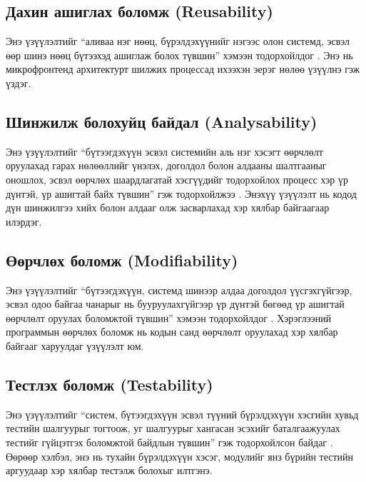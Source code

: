 \subsection{Дахин ашиглах боломж (Reusability)}

Энэ үзүүлэлтийг ``аливаа нэг нөөц, бүрэлдэхүүнийг нэгээс олон системд, эсвэл өөр шинэ нөөц бүтээхэд ашиглаж болох түвшин'' хэмээн тодорхойлдог \cite{iso25010_2}. Энэ нь микрофронтенд архитектурт шилжих процессад ихээхэн эерэг нөлөө үзүүлнэ гэж үздэг.

\subsection{Шинжилж болохуйц байдал (Analysability)}

Энэ үзүүлэлтийг ``бүтээгдэхүүн эсвэл системийн аль нэг хэсэгт өөрчлөлт оруулахад гарах нөлөөллийг үнэлэх, доголдол болон алдааны шалтгааныг оношлох, эсвэл өөрчлөх шаардлагатай хэсгүүдийг тодорхойлох процесс хэр үр дүнтэй, үр ашигтай байх түвшин'' гэж тодорхойлжээ \cite{iso25010_2}. Энэхүү үзүүлэлт нь кодод дүн шинжилгээ хийх болон алдааг олж засварлахад хэр хялбар байгаагаар илэрдэг.

\subsection{Өөрчлөх боломж (Modifiability)}

Энэ үзүүлэлтийг ``бүтээгдэхүүн, системд шинээр алдаа доголдол үүсгэхгүйгээр, эсвэл одоо байгаа чанарыг нь бууруулахгүйгээр үр дүнтэй бөгөөд үр ашигтай өөрчлөлт оруулах боломжтой түвшин'' хэмээн тодорхойлдог \cite{iso25010_2}. Хэрэглээний программын өөрчлөх боломж нь кодын санд өөрчлөлт оруулахад хэр хялбар байгааг харуулдаг үзүүлэлт юм.

\subsection{Тестлэх боломж (Testability)}

Энэ үзүүлэлтийг ``систем, бүтээгдэхүүн эсвэл түүний бүрэлдэхүүн хэсгийн хувьд тестийн шалгуурыг тогтоож, уг шалгуурыг хангасан эсэхийг баталгаажуулах тестийг гүйцэтгэх боломжтой байдлын түвшин'' гэж тодорхойлсон байдаг \cite{iso25010_2}. Өөрөөр хэлбэл, энэ нь тухайн бүрэлдэхүүн хэсэг, модулийг янз бүрийн тестийн аргуудаар хэр хялбар тестэлж болохыг илтгэнэ.

